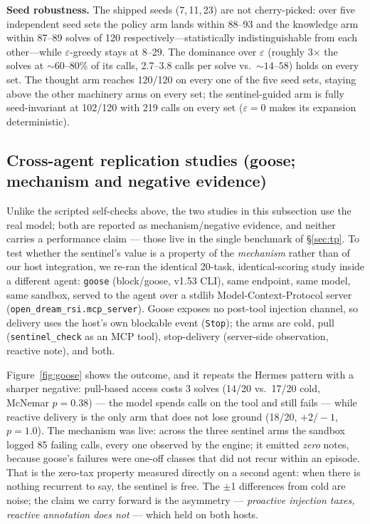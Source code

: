 \documentclass[11pt,a4paper]{article}
\newcommand{\hdr}[1]{\textbf{#1}}
\begin{document}
\hdr{Seed robustness.} The shipped seeds (7,\,11,\,23) are not cherry-picked:
over five independent seed sets the policy arm lands within 88--93 and the
knowledge arm within 87--89 solves of 120 respectively---statistically
indistinguishable from each other---while $\varepsilon$-greedy stays at
8--29. The dominance over $\varepsilon$ (roughly 3$\times$ the solves at
${\sim}60$--$80\%$ of its calls, 2.7--3.8 calls per solve vs.\ ${\sim}14$--$58$) holds on
every set.
The thought arm reaches 120/120 on every one of the five seed sets, staying
above the other machinery arms on every set; the sentinel-guided arm is
fully seed-invariant at 102/120 with 219 calls on every set ($\varepsilon{=}0$
makes its expansion deterministic).

\subsection{Cross-agent replication studies (goose; mechanism and negative evidence)}
\label{sec:goose}

Unlike the scripted self-checks above, the two studies in this subsection use
the real model; both are reported as mechanism/negative evidence, and neither
carries a performance claim --- those live in the single benchmark of
\S\ref{sec:tp}.
To test whether the sentinel's value is a property of the \emph{mechanism}
rather than of our host integration, we re-ran the identical 20-task,
identical-scoring study inside a different agent: \texttt{goose}
(block/goose, v1.53 CLI), same endpoint, same model, same sandbox, served
to the agent over a stdlib Model-Context-Protocol server
(\texttt{open\_dream\_rsi.mcp\_server}). Goose exposes no post-tool
injection channel, so delivery uses the host's own blockable event
(\texttt{Stop}); the arms are cold, pull (\texttt{sentinel\_check} as an
MCP tool), stop-delivery (server-side observation, reactive note), and both.

Figure~\ref{fig:goose} shows the outcome, and it repeats the Hermes pattern
with a sharper negative: pull-based access costs 3 solves
(14/20 vs.\ 17/20 cold, McNemar $p{=}0.38$) --- the model spends calls on
the tool and still fails --- while reactive delivery is the only arm that
does not lose ground (18/20, $+2/-1$, $p{=}1.0$). The mechanism was live:
across the three sentinel arms the sandbox logged 85 failing calls, every
one observed by the engine; it emitted \emph{zero} notes, because goose's
failures were
one-off classes that did not recur within an episode. That is the
zero-tax property measured directly on a second agent: when there is
nothing recurrent to say, the sentinel is free. The $\pm$1 differences
from cold are noise; the claim we carry forward is the asymmetry
--- \emph{proactive injection taxes, reactive annotation does not} ---
which held on both hosts.
\end{document}
